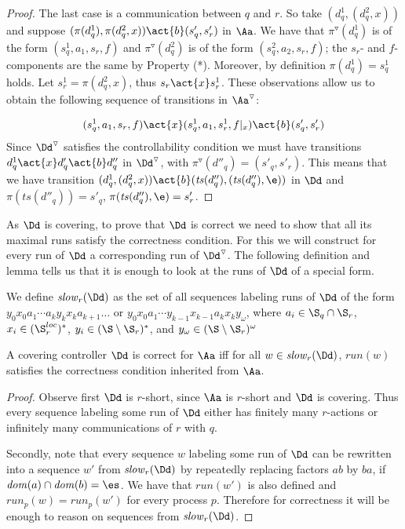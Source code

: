 \documentclass[10pt,a4paper]{article}
\newcommand{\anca}[1]{}
\newcommand{\run}{\mathit{run}}
\newcommand{\ts}{\mathit{ts}}
\newcommand{\red}[1]{#1^\triangledown}
\newcommand{\slow}{\mathit{slow}}
\newcommand{\loc}{\mathit{dom}}
\begin{document}
\begin{proof}
  The last case is a communication between $q$ and $r$. So take
  $(d^1_q,(d^2_q,x))$ and suppose
  $(\pi(d^1_q),\pi(d^2_q,x))\act{b}(s'_q,s'_r)$ in $\Aa$. We have that
  $\red\pi(d^1_q)$ is of the form $(s^1_q,a_1,s_r,f)$ and
  $\red\pi(d^2_q)$ is of the form $(s^2_q,a_2,s_r,f)$; the $s_r$- and
  $f$-components are the same by Property (*). Moreover,
  by definition $\pi(d^1_q)=s^1_q$ holds. Let $s^1_r=\pi(d^2_q,x)$, thus
  $s_r\act{x}s^1_r$. These observations allow us to
  obtain the following sequence of transitions in $\red\Aa$:
  \anca{changed 2nd f in f'}
  \begin{equation*}
    (s^1_q,a_1,s_r,f)\act{x}(s^1_q,a_1,s^1_r,f|_x)\act{b}(s'_q,s'_r)
  \end{equation*}
  Since $\red\Dd$ satisfies the controllability condition   we must
  have transitions $d^1_q\act{x}d'_q\act{b}d''_q$ in $\red\Dd$, 
  with $\red\pi(d''_q)=(s'_q,s'_r)$. This means that we have transition
  $(d^1_q,(d^2_q,x))\act{b}(\ts(d''_q),(\ts(d''_q),\e))$ in $\Dd$ and 
  $\pi(\ts(d''_q))=s'_q$, $\pi(\ts(d''_q),\e)=s'_r$. 
\end{proof}

As $\Dd$ is covering, to prove that $\Dd$ is correct we need to show
that all its maximal runs satisfy the correctness condition. For this
we will construct for every run of $\Dd$ a corresponding run of $\red
\Dd$. The following definition and lemma tells us that it is enough to
look at the runs of $\Dd$ of a special form. 
\begin{definition}[$\slow$]\label{def:slow}
  We define $\slow_r(\Dd)$ as the set of all 
  sequences labeling runs of $\Dd$ of the form $ y_0x_0a_1\cdots a_k
  y_k x_k a_{k+1}\dots$ or $y_0x_0a_1\cdots y_{k-1}x_{k-1} a_k x_k
  y_\omega$, 
where $a_i\in \S_q \cap \S_r$, $x_i\in (\S^{loc}_r)^*$,  $y_i\in
(\S \setminus \S_r)^*$, and $y_\omega\in
(\S \setminus \S_r)^\omega$
\end{definition}

\begin{lemma}\label{lemma:reduciton-to-slow}
 A covering controller $\Dd$ is correct for $\Aa$ iff
  for all $w\in\slow_r(\Dd)$, $\run(w)$ satisfies the correctness condition
  inherited from $\Aa$.
\end{lemma}

\begin{proof}
  Observe first $\Dd$ is
  $r$-short, since $\Aa$ is $r$-short and $\Dd$ is covering. Thus
  every sequence labeling some run of $\Dd$  either has
  finitely many $r$-actions or infinitely many communications of $r$
  with $q$.  

  Secondly, note that every sequence $w$ labeling
  some run of $\Dd$ can be rewritten into a sequence $w'$ from
  $\slow_r(\Dd)$ by repeatedly replacing factors $ab$ by $ba$, if
  $\loc(a) \cap \loc(b)=\es$. We have that $\run(w')$ is also
  defined and $\run_p(w)=\run_p(w')$ for every
  process $p$. Therefore for
  correctness it will be enough to reason on sequences from
  $\slow_r(\Dd)$.
\end{proof}
\end{document}
